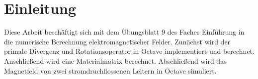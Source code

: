 \chapter{Einleitung}\label{sec:intro}
Diese Arbeit beschäftigt sich mit dem Übungsblatt 9 des Faches \glqq Einführung in die numerische Berechnung elektromagnetischer Felder\grqq{}.
Zunächst wird der primale Divergenz und Rotationsoperator in Octave implementiert und berechnet. Anschließend wird eine Materialmatrix berechnet. Abschließend wird das Magnetfeld von zwei stromdruchflossenen Leitern in Octave simuliert.